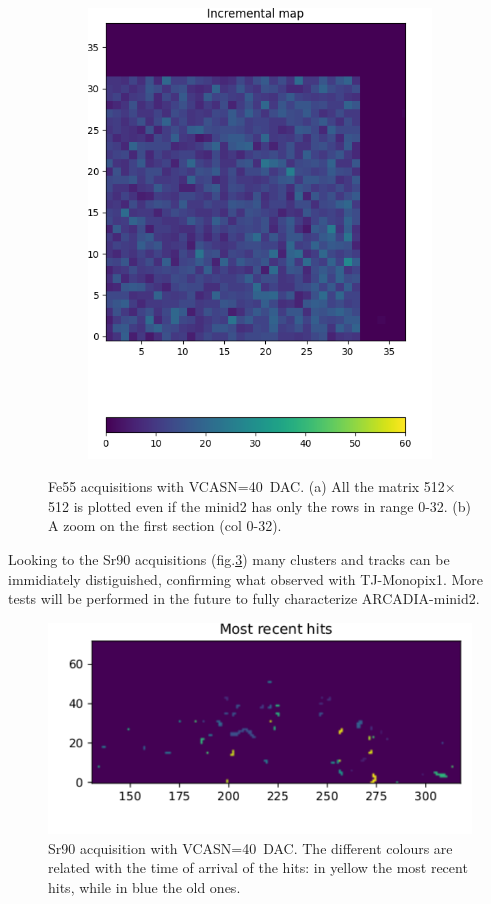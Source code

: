 \begin{figure}
\begin{subfigure}[b]{0.45\textwidth}
            \includegraphics[width=0.8\linewidth]{figures/charaterization/ARCADIA/Fe55_6min30s.png}
            \caption{}
            \label{fig:ARCADIA_Fe55b}
        \end{subfigure}
        \caption{Fe55 acquisitions with VCASN=\SI{40}{DAC}. (a) All the matrix 512$\times$512 is plotted even if the minid2 has only the rows in range 0-32. (b) A zoom on the first section (col 0-32). }
        \label{fig:ARCADIA_Fe55}
    \end{figure} 

    Looking to the Sr90 acquisitions (fig.\ref{fig:ARCADIA_Sr90}) many clusters and tracks can be immidiately distiguished, confirming what observed with TJ-Monopix1. 
    More tests will be performed in the future to fully characterize ARCADIA-minid2.
    \begin{figure}[h!]
        \centering
        \includegraphics[width=0.6\linewidth]{figures/charaterization/ARCADIA/Sr90_2min.pdf}
        \caption{Sr90 acquisition with VCASN=\SI{40}{DAC}. The different colours are related with the time of arrival of the hits: in yellow the most recent hits, while in blue the old ones.}
        \label{fig:ARCADIA_Sr90}
    \end{figure}  
    





